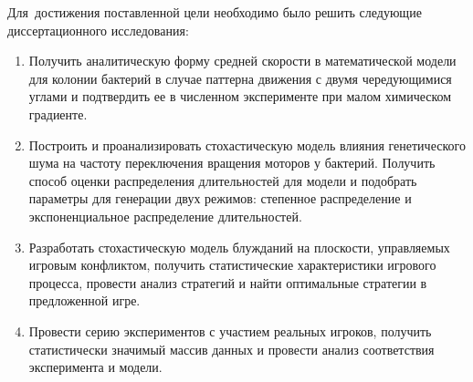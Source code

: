 Для~достижения поставленной цели необходимо было решить следующие {\tasks} диссертационного исследования:
\begin{enumerate}[beginpenalty=10000] %
    \item Получить аналитическую форму средней скорости в математической модели для колонии бактерий в случае паттерна движения с двумя чередующимися углами и подтвердить ее в численном эксперименте при малом химическом градиенте.
    \item Построить и проанализировать стохастическую модель влияния генетического шума на частоту переключения вращения моторов у бактерий. Получить способ оценки распределения длительностей для модели и подобрать параметры для генерации двух режимов: степенное распределение и экспоненциальное распределение длительностей.
    \item Разработать стохастическую модель блужданий на плоскости, управляемых игровым конфликтом, получить статистические характеристики игрового процесса, провести анализ стратегий и найти оптимальные стратегии в предложенной игре. 
    \item Провести серию экспериментов с участием реальных игроков, получить статистически значимый массив данных и провести анализ соответствия эксперимента и модели.
\end{enumerate}


